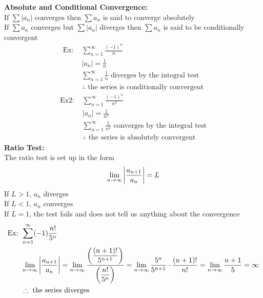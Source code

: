 \documentclass[11pt, fleqn]{article}
\begin{document}
\textbf{Absolute and Conditional Convergence:}\\
If $\sum|a_n|$ converges then $\sum a_n$ is said to converge absolutely\\
If $\sum a_n$ converges but $\sum|a_n|$ diverges then $\sum a_n$ is said to be conditionally convergent\\
\begin{align*}
    \text{Ex: }&\sum_{n=1}^\infty\frac{(-1)^n}{n}\\
    &|a_n|=\frac{1}{n}\\
    &\sum_{n=1}^\infty\frac{1}{n}\text{ diverges by the integral test}\\
    &\therefore\text{ the series is conditionally convergent}
\end{align*}
\begin{align*}
    \text{Ex2: }&\sum_{n=1}^\infty\frac{(-1)^n}{n^2}\\
    &|a_n|=\frac{1}{n^2}\\
    &\sum_{n=1}^\infty\frac{1}{n^2}\text{ converges by the integral test}\\
    &\therefore\text{ the series is absolutely convergent}
\end{align*}
\textbf{Ratio Test:}\\
The ratio test is set up in the form
$$\lim_{n\to\infty}\left| \frac{a_{n+1}}{a_n} \right|=L$$
If $L>1$, $a_n$ diverges\\
If $L<1$, $a_n$ converges\\
If $L=1$, the test fails and does not tell us anything about the convergence
\begin{align*}
    \text{Ex: }&\sum_{n=1}^\infty(-1)\frac{n!}{5^n}\\
    &\lim_{n\to\infty}\left| \frac{a_{n+1}}{a_n} \right|=\lim_{n\to\infty}\frac{\displaystyle\left( \frac{(n+1)!}{5^{n+1}} \right)}{\displaystyle\left( \frac{n!}{5^n} \right)}=\lim_{n\to\infty}\frac{5^n}{5^{n+1}}\cdot\frac{(n+1)!}{n!}=\lim_{n\to\infty}\frac{n+1}{5}=\infty\\
    &\therefore\text{ the series diverges}
\end{align*}
\end{document}
